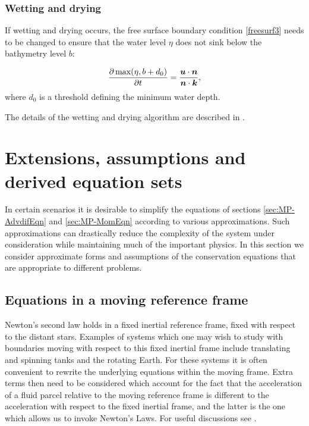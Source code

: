 \subsubsection{Wetting and drying}\label{sec:WD}
If wetting and drying occurs, the free surface boundary condition \ref{freesurf3} needs to be changed to ensure that the water level $\eta$ does not sink below the bathymetry level $b$:

\begin{equation}\label{eq:wd1}
\frac{\partial \max(\eta, b+d_0)}{\partial t}=\frac{{\mbox{\boldmath$u$}} \cdot {\mbox{\boldmath$n$}}}{{\mbox{\boldmath$n$}} \cdot {\mbox{\boldmath$k$}}},
\end{equation}
where $d_0$ is a threshold defining the minimum water depth.

The details of the wetting and drying algorithm are described in \cite{Funke2011}.

\section{Extensions, assumptions and derived equation sets}\label{sec:eqn_extensions}

In certain scenarios it is desirable to simplify the equations of sections \ref{sec:MP-AdvdifEqn} and \ref {sec:MP-MomEqn} according to various approximations. Such approximations can drastically reduce the complexity of the system under consideration while maintaining much of the important physics. In this section we consider approximate forms and assumptions of the conservation equations that are appropriate to different problems. 

\subsection{Equations in a moving reference frame}\label{sec:coriolis}
Newton's second law holds in a fixed inertial reference frame, \ie
fixed with respect to the distant stars. 
Examples of systems which one may wish to study with boundaries moving
with respect to this fixed inertial frame include translating and spinning tanks
and the rotating Earth. For these systems it is often convenient to rewrite the 
underlying equations within the moving frame. Extra terms then need to be considered 
which account for the fact that the acceleration of a fluid parcel relative to the 
moving reference frame is different to the acceleration with respect to the fixed 
inertial frame, and the latter is the one which allows us to invoke Newton's Laws.
For useful discussions see \citep{batchelor1967,cushman1994,gill1982}.

